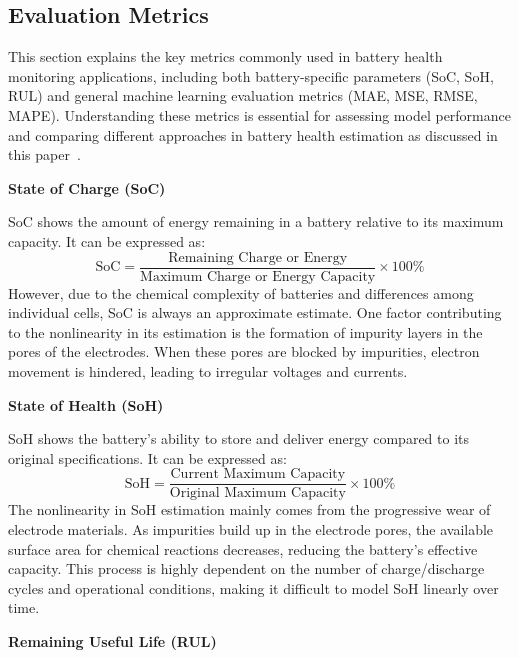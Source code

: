\subsection{Evaluation Metrics}

This section explains the key metrics commonly used in battery health monitoring applications, including both battery-specific parameters (SoC, SoH, RUL) and general machine learning evaluation metrics (MAE, MSE, RMSE, MAPE). Understanding these metrics is essential for assessing model performance and comparing different approaches in battery health estimation as discussed in this paper~\cite{ren_review_2023}.

\vspace{1cm}
\textbf{State of Charge (SoC)}

SoC shows the amount of energy remaining in a battery relative to its maximum capacity. It can be expressed as:
\begin{equation}
\text{SoC} = \frac{\text{Remaining Charge or Energy}}{\text{Maximum Charge or Energy Capacity}} \times 100\%
\end{equation}
However, due to the chemical complexity of batteries and differences among individual cells, SoC is always an approximate estimate. One factor contributing to the nonlinearity in its estimation is the formation of impurity layers in the pores of the electrodes. When these pores are blocked by impurities, electron movement is hindered, leading to irregular voltages and currents.

\vspace{1cm}
\textbf{State of Health (SoH)}

SoH shows the battery's ability to store and deliver energy compared to its original specifications. It can be expressed as:
\begin{equation}
\text{SoH} = \frac{\text{Current Maximum Capacity}}{\text{Original Maximum Capacity}} \times 100\%
\end{equation}
The nonlinearity in SoH estimation mainly comes from the progressive wear of electrode materials. As impurities build up in the electrode pores, the available surface area for chemical reactions decreases, reducing the battery's effective capacity. This process is highly dependent on the number of charge/discharge cycles and operational conditions, making it difficult to model SoH linearly over time.

\vspace{1cm}
\textbf{Remaining Useful Life (RUL)}

